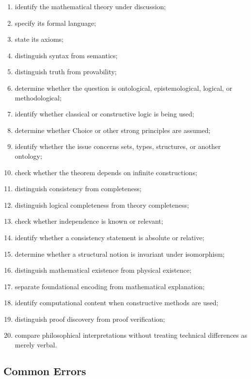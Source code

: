 \begin{enumerate}
    \item identify the mathematical theory under discussion;
    \item specify its formal language;
    \item state its axioms;
    \item distinguish syntax from semantics;
    \item distinguish truth from provability;
    \item determine whether the question is ontological, epistemological,
          logical, or methodological;
    \item identify whether classical or constructive logic is being used;
    \item determine whether Choice or other strong principles are assumed;
    \item identify whether the issue concerns sets, types, structures, or
          another ontology;
    \item check whether the theorem depends on infinite constructions;
    \item distinguish consistency from completeness;
    \item distinguish logical completeness from theory completeness;
    \item check whether independence is known or relevant;
    \item identify whether a consistency statement is absolute or relative;
    \item determine whether a structural notion is invariant under
          isomorphism;
    \item distinguish mathematical existence from physical existence;
    \item separate foundational encoding from mathematical explanation;
    \item identify computational content when constructive methods are used;
    \item distinguish proof discovery from proof verification;
    \item compare philosophical interpretations without treating technical
          differences as merely verbal.
\end{enumerate}

\subsection{Common Errors}
\label{subsec:philosophy-foundations-common-errors}


